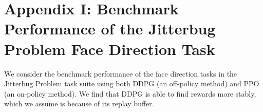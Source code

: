 \documentclass[letterpaper, 10 pt, conference]{ieeeconf}
\begin{document}










\section*{Appendix I: Benchmark Performance of the Jitterbug Problem Face Direction Task}



We consider the benchmark performance of the face direction tasks in the Jitterbug Problem task suite using both DDPG \cite{DDPG} (an off-policy method) and PPO \cite{PPO} (an on-policy method).  We find that DDPG is able to find rewards more stably, which we assume is because of its replay buffer. %
\end{document}
